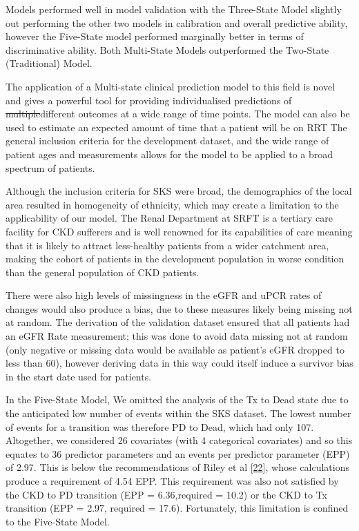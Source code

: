 \documentclass[12pt,PhD,twoside,openright]{muthesis}
\begin{document}
Models performed well in model validation with the Three-State Model slightly out performing the other two models in calibration and overall predictive ability, however the Five-State model performed marginally better in terms of discriminative ability. Both Multi-State Models outperformed the Two-State (Traditional) Model.

The application of a Multi-state clinical prediction model to this field is novel and gives a powerful tool for providing individualised predictions of \sout{multiple}different outcomes at a wide range of time points. The model can also be used to estimate an expected amount of time that a patient will be on RRT The general inclusion criteria for the development dataset, and the wide range of patient ages and measurements allows for the model to be applied to a broad spectrum of patients.

Although the inclusion criteria for SKS were broad, the demographics of the local area resulted in homogeneity of ethnicity, which may create a limitation to the applicability of our model. The Renal Department at SRFT is a tertiary care facility for CKD sufferers and is well renowned for its capabilities of care meaning that it is likely to attract less-healthy patients from a wider catchment area, making the cohort of patients in the development population in worse condition than the general population of CKD patients.

There were also high levels of missingness in the eGFR and uPCR rates of changes would also produce a bias, due to these measures likely being missing not at random. The derivation of the validation dataset ensured that all patients had an eGFR Rate measurement; this was done to avoid data missing not at random (only negative or missing data would be available as patient's eGFR dropped to less than 60), however deriving data in this way could itself induce a survivor bias in the start date used for patients.

In the Five-State Model, We omitted the analysis of the Tx to Dead state due to the anticipated low number of events within the SKS dataset. The lowest number of events for a transition was therefore PD to Dead, which had only 107. Altogether, we considered 26 covariates (with 4 categorical covariates) and so this equates to 36 predictor parameters and an events per predictor parameter (EPP) of 2.97. This is below the recommendations of Riley et al {[}\protect\hyperlink{ref-riley_minimum_2019}{22}{]}, whose calculations produce a requirement of 4.54 EPP. This requirement was also not satisfied by the CKD to PD transition (EPP = 6.36,required = 10.2) or the CKD to Tx transition (EPP = 2.97, required = 17.6). Fortunately, this limitation is confined to the Five-State Model.
\end{document}
